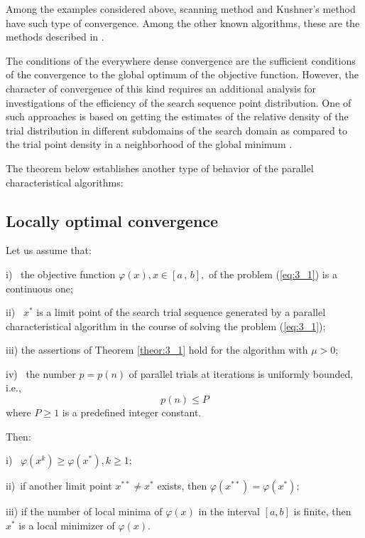 	Among the examples considered above, scanning method and Kushner's method have such type of convergence. Among the other known algorithms, these are the methods described in \cite{3_Gorodetsky, 3_Zilinskas1975}.
	
		The conditions of the everywhere dense convergence are the sufficient conditions of the convergence to the global optimum of the objective function. However, the character of convergence of this kind requires an additional analysis for investigations of the efficiency of the search sequence point distribution. One of such approaches is based on getting the estimates of the relative density of the trial distribution in different subdomains of the search domain as compared to the trial point density in a neighborhood of the global minimum \cite{3_Gorodetsky, 3_GoroGri}.
	
	The theorem below establishes another type of behavior of the parallel characteristical algorithms: 
	
	\subsection{Locally optimal convergence}
	
	\begin{theorem}
	\label{theor:3_3}
		Let us assume that:
		
		\noindent i)~ the objective function $\varphi (x),x\in [a\, ,\, b],$ of the problem  (\ref{eq:3_1}) is a continuous one;
		
		\noindent ii)~ $x^{*} $ is a limit point of the search trial sequence generated by a parallel characteristical algorithm in the course of solving the problem  (\ref{eq:3_1});
		
		\noindent iii) the assertions of Theorem \ref{theor:3_1} hold for the algorithm with $\mu >0$; 
		
		\noindent iv)~ the number $p=p(n)$ of parallel trials at iterations is uniformly bounded, i.e.,
		\[p(n)\le P\] 
		where $P\ge 1$ is a predefined integer constant.
		
		\noindent Then:
		
		\noindent i)~ $\varphi (x^{k} )\ge \varphi (x^{*} ),k\ge 1;$
		
		\noindent ii)~if another limit point $x^{**} \ne x^{*} $ exists, then $\varphi (x^{**} )=\varphi (x^{*} );$
		
		\noindent iii) if the number of local minima of $\varphi (x)$ in the interval $[a,b]$ is finite, then $x^{*} $ is a local minimizer of $\varphi (x)$.
	\end{theorem} 

